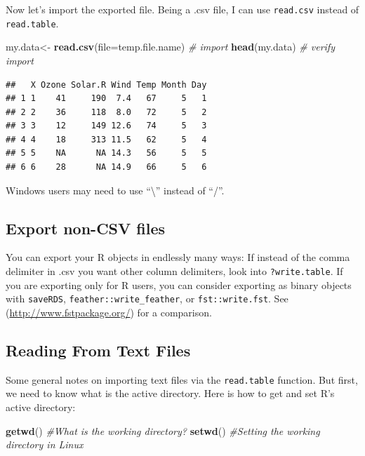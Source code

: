 \documentclass[]{book}
\newenvironment{Shaded}{\begin{snugshade}}{\end{snugshade}}
\newcommand{\KeywordTok}[1]{\textcolor[rgb]{0.13,0.29,0.53}{\textbf{#1}}}
\newcommand{\DataTypeTok}[1]{\textcolor[rgb]{0.13,0.29,0.53}{#1}}
\newcommand{\StringTok}[1]{\textcolor[rgb]{0.31,0.60,0.02}{#1}}
\newcommand{\CommentTok}[1]{\textcolor[rgb]{0.56,0.35,0.01}{\textit{#1}}}
\newcommand{\NormalTok}[1]{#1}
\theoremstyle{definition}
\theoremstyle{definition}
\theoremstyle{definition}
\theoremstyle{remark}
\let\BeginKnitrBlock\begin \let\EndKnitrBlock\end
\begin{document}
Now let's import the exported file. Being a .csv file, I can use
\texttt{read.csv} instead of \texttt{read.table}.

\begin{Shaded}
\begin{Highlighting}[]
\NormalTok{my.data<-}\StringTok{ }\KeywordTok{read.csv}\NormalTok{(}\DataTypeTok{file=}\NormalTok{temp.file.name) }\CommentTok{# import}
\KeywordTok{head}\NormalTok{(my.data) }\CommentTok{# verify import}
\end{Highlighting}
\end{Shaded}

\begin{verbatim}
##   X Ozone Solar.R Wind Temp Month Day
## 1 1    41     190  7.4   67     5   1
## 2 2    36     118  8.0   72     5   2
## 3 3    12     149 12.6   74     5   3
## 4 4    18     313 11.5   62     5   4
## 5 5    NA      NA 14.3   56     5   5
## 6 6    28      NA 14.9   66     5   6
\end{verbatim}

\BeginKnitrBlock{remark}
{}Windows users may need to use
``\textbackslash{}'' instead of ``/''.
\EndKnitrBlock{remark}

\subsection{Export non-CSV files}\label{export-non-csv-files}

You can export your R objects in endlessly many ways: If instead of the
comma delimiter in .csv you want other column delimiters, look into
\texttt{?write.table}. If you are exporting only for R users, you can
consider exporting as binary objects with \texttt{saveRDS},
\texttt{feather::write\_feather}, or \texttt{fst::write.fst}. See
(\url{http://www.fstpackage.org/}) for a comparison.

\subsection{Reading From Text Files}\label{reading-from-text-files}

Some general notes on importing text files via the \texttt{read.table}
function. But first, we need to know what is the active directory. Here
is how to get and set R's active directory:

\begin{Shaded}
\begin{Highlighting}[]
\KeywordTok{getwd}\NormalTok{() }\CommentTok{#What is the working directory?}
\KeywordTok{setwd}\NormalTok{() }\CommentTok{#Setting the working directory in Linux}
\end{Highlighting}
\end{Shaded}
\end{document}
